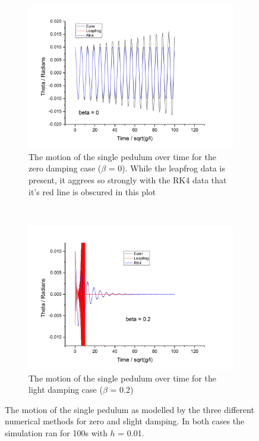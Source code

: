 \documentclass[11pt]{article}
\begin{document}
\begin{figure}[h!] \label{fig:sp_motion}
  \centering
  \begin{subfigure}[h]{0.5\textwidth}
    \includegraphics[width=\textwidth]{img/theta_vs_t_gamma=0.png}
    \captionsetup{width=0.85\textwidth}
    \caption{The motion of the single pedulum over time for the zero damping case ($\beta$ = 0). While the leapfrog data is present, it aggrees so strongly with the RK4 data that it's red line is obscured in this plot}
    \label{fig:sp_beta0}
  \end{subfigure}%
  ~ %
  \begin{subfigure}[h]{0.5\textwidth}
    \includegraphics[width=\textwidth]{img/theta_vs_t_gamma=0-2.png}
    \captionsetup{width=0.85\textwidth}
    \caption{The motion of the single pedulum over time for the light damping case ($\beta$ = 0.2)}
    \label{fig:sp_beta0.2}
  \end{subfigure}
  \caption{The motion of the single pedulum as modelled by the three different numerical methods for zero and slight damping. In both cases the simulation ran for 100s with $h$ = 0.01.}
\end{figure}
\end{document}
